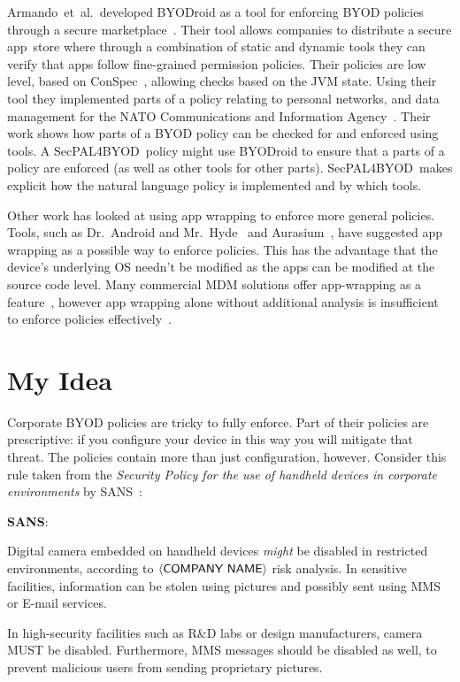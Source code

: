 \documentclass{llncs}
\makeatletter
\newcommand{\etal}{et~al.\@}
\newcommand{\AppPAL}[0]{SecPAL4BYOD}
\newenvironment{policyrule}[1]{%
  \begin{mdframed}\footnotesize
      \noindent\textbf{\sffamily #1}:~\itshape%
}{%
  \end{mdframed}
}
\makeatother
\begin{document}
Armando~\etal~developed BYODroid as a tool for enforcing BYOD policies through a secure marketplace~\cite{armando_enabling_2014}.
Their tool allows companies to distribute a secure app~store where through a combination of static and dynamic tools they can verify that apps follow fine-grained permission policies.
Their policies are low level, based on ConSpec~\cite{aktug_conspec_2008}, allowing checks based on the JVM state.
Using their tool they implemented parts of a policy relating to personal networks, and data management for the NATO Communications and Information Agency~\cite{armando_developing_2016}.
Their work shows how parts of a BYOD policy can be checked for and enforced using tools.
A \AppPAL~policy might use BYODroid to ensure that a parts of a policy are enforced (as well as other tools for other parts).
\AppPAL~makes explicit how the natural language policy is implemented and by which tools.

Other work has looked at using app wrapping to enforce more general policies.
Tools, such as Dr.~Android and Mr.~Hyde~\cite{jeon_dr._2012} and Aurasium~\cite{xu_aurasium:_2012}, have suggested app wrapping as a possible way to enforce policies.
This has the advantage that the device's underlying OS needn't be modified as the apps can be modified at the source code level.
Many commercial \ac{MDM} solutions offer app-wrapping as a feature~\cite{_ibm_????,_app_????}, however app wrapping alone without additional analysis is insufficient to enforce policies effectively~\cite{hao_effectiveness_2013}.


\section{My Idea}
\label{sec:idea}

Corporate BYOD policies are tricky to fully enforce.
Part of their policies are prescriptive:  if you configure your device in this way you will mitigate that threat.
The policies contain more than just configuration, however.
Consider this rule taken from the \emph{Security Policy for the use of handheld devices in corporate environments} by SANS~\cite{nicholas_r._c._guerin_security_2008}:

\newcommand{\textbra}[1]{\ensuremath{\left\langle \text{\sffamily #1} \right\rangle}}
\begin{policyrule}{SANS}
  Digital camera embedded on handheld devices \emph{might} be disabled in restricted environments, according to \textbra{COMPANY NAME} risk analysis.
  In sensitive facilities, information can be stolen using pictures and possibly sent using MMS or E-mail services.

  In high-security facilities such as R\&D labs or design manufacturers, camera MUST be disabled.
  Furthermore, MMS messages should be disabled as well, to prevent malicious users from sending proprietary pictures.
\end{policyrule}
\end{document}
